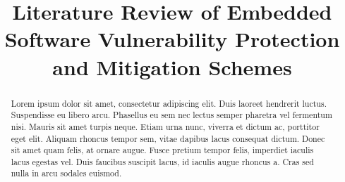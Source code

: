 \documentclass[final,conference,10pt]{IEEEtran}
\begin{document}
%
\title{Literature Review of Embedded Software Vulnerability Protection and Mitigation Schemes}

\author{
}

\maketitle


\begin{abstract}
Lorem ipsum dolor sit amet, consectetur adipiscing elit. Duis laoreet hendrerit luctus. Suspendisse eu libero arcu. Phasellus eu sem nec lectus semper pharetra vel fermentum nisi. Mauris sit amet turpis neque. Etiam urna nunc, viverra et dictum ac, porttitor eget elit. Aliquam rhoncus tempor sem, vitae dapibus lacus consequat dictum. Donec sit amet quam felis, at ornare augue. Fusce pretium tempor felis, imperdiet iaculis lacus egestas vel. Duis faucibus suscipit lacus, id iaculis augue rhoncus a. Cras sed nulla in arcu sodales euismod.
\end{abstract}
\end{document}
